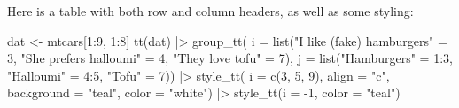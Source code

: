 \documentclass[
  letterpaper,
  DIV=11,
  numbers=noendperiod]{scrartcl}
\newenvironment{Shaded}{\begin{snugshade}}{\end{snugshade}}
\newcommand{\AttributeTok}[1]{\textcolor[rgb]{0.40,0.45,0.13}{#1}}
\newcommand{\DecValTok}[1]{\textcolor[rgb]{0.68,0.00,0.00}{#1}}
\newcommand{\FunctionTok}[1]{\textcolor[rgb]{0.28,0.35,0.67}{#1}}
\newcommand{\NormalTok}[1]{\textcolor[rgb]{0.00,0.23,0.31}{#1}}
\newcommand{\OtherTok}[1]{\textcolor[rgb]{0.00,0.23,0.31}{#1}}
\newcommand{\SpecialCharTok}[1]{\textcolor[rgb]{0.37,0.37,0.37}{#1}}
\newcommand{\StringTok}[1]{\textcolor[rgb]{0.13,0.47,0.30}{#1}}
\begin{document}
Here is a table with both row and column headers, as well as some
styling:

\begin{Shaded}
\begin{Highlighting}[]
\NormalTok{dat }\OtherTok{\textless{}{-}}\NormalTok{ mtcars[}\DecValTok{1}\SpecialCharTok{:}\DecValTok{9}\NormalTok{, }\DecValTok{1}\SpecialCharTok{:}\DecValTok{8}\NormalTok{]}
\FunctionTok{tt}\NormalTok{(dat) }\SpecialCharTok{|\textgreater{}} 
  \FunctionTok{group\_tt}\NormalTok{(}
    \AttributeTok{i =} \FunctionTok{list}\NormalTok{(}\StringTok{"I like (fake) hamburgers"} \OtherTok{=} \DecValTok{3}\NormalTok{,}
             \StringTok{"She prefers halloumi"} \OtherTok{=} \DecValTok{4}\NormalTok{,}
             \StringTok{"They love tofu"} \OtherTok{=} \DecValTok{7}\NormalTok{),}
    \AttributeTok{j =} \FunctionTok{list}\NormalTok{(}\StringTok{"Hamburgers"} \OtherTok{=} \DecValTok{1}\SpecialCharTok{:}\DecValTok{3}\NormalTok{,}
             \StringTok{"Halloumi"} \OtherTok{=} \DecValTok{4}\SpecialCharTok{:}\DecValTok{5}\NormalTok{,}
             \StringTok{"Tofu"} \OtherTok{=} \DecValTok{7}\NormalTok{)) }\SpecialCharTok{|\textgreater{}}
  \FunctionTok{style\_tt}\NormalTok{(}
    \AttributeTok{i =} \FunctionTok{c}\NormalTok{(}\DecValTok{3}\NormalTok{, }\DecValTok{5}\NormalTok{, }\DecValTok{9}\NormalTok{),}
    \AttributeTok{align =} \StringTok{"c"}\NormalTok{,}
    \AttributeTok{background =} \StringTok{"teal"}\NormalTok{,}
    \AttributeTok{color =} \StringTok{"white"}\NormalTok{) }\SpecialCharTok{|\textgreater{}}
  \FunctionTok{style\_tt}\NormalTok{(}\AttributeTok{i =} \SpecialCharTok{{-}}\DecValTok{1}\NormalTok{, }\AttributeTok{color =} \StringTok{"teal"}\NormalTok{)}
\end{Highlighting}
\end{Shaded}
\end{document}
